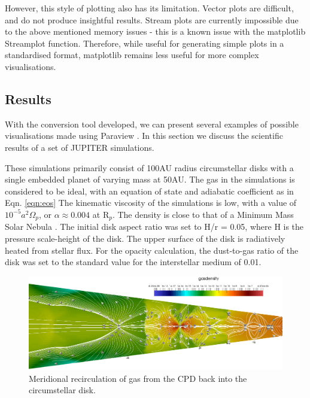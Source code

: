 \documentclass[preprint2]{aastex62}
\begin{document}
However, this style of plotting also has its limitation. 
Vector plots are difficult, and do not produce insightful results.
Stream plots are currently impossible due to the above mentioned memory issues - this is a known issue with the matplotlib Streamplot function.
Therefore, while useful for generating simple plots in a standardised format, matplotlib remains less useful for more complex visualisations.


\subsection{Results}\label{sec:res}
With the conversion tool developed, we can present several examples of possible visualisations made using Paraview \cite{para}. In this section we discuss the scientific results of a set of JUPITER simulations. 


These simulations primarily consist of 100AU radius circumstellar disks with a single embedded planet of varying mass at 50AU.
The gas in the simulations is considered to be ideal, with an equation of state and adiabatic coefficient as in Eqn. \ref{eqn:eos}
The kinematic viscosity of the simulations is low, with a value of $10^{-5}a^{2}\Omega_{p}$, or $\alpha \approx 0.004$ at R$_{p}$. The density is close to that of a Minimum Mass Solar Nebula \cite{MSMN}. 
The initial disk aspect ratio was set to H/r = 0.05, where H is the pressure scale-height of the disk. 
The upper surface of the disk is radiatively heated from stellar flux.
For the opacity calculation, the dust-to-gas ratio of the disk was set to the standard value for the interstellar medium of 0.01.

\begin{figure}[h]
	\includegraphics[width=\linewidth]{figures/Presentation/recirc.png}
	\caption{\label{fig:recirc}Meridional recirculation of gas from the CPD back into the circumstellar disk.}
\end{figure}
\end{document}
